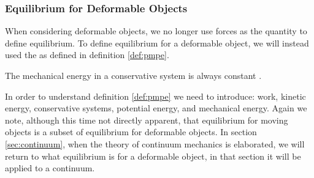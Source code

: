 



\subsubsection{Equilibrium for Deformable Objects}
\label{sec:equilibrium-for-deobj}
When considering deformable objects, we no longer use forces as
the quantity to define equilibrium.
%
%
To define equilibrium for a deformable object, we will instead used
the  as defined in
definition \vref{def:pmpe}.
 
\begin{definition}
\label{def:pmpe}
The mechanical energy in a conservative system is always constant
.
\end{definition}

In order to understand definition \vref{def:pmpe} we need to
introduce: work, kinetic energy, conservative systems, potential
energy, and mechanical energy. Again we note, although this time not
directly apparent, that equilibrium for moving objects is a subset of
equilibrium for deformable objects. In section \vref{sec:continuum},
when the theory of continuum mechanics is elaborated, we will return
to what equilibrium is for a deformable object, in that section it will be
applied to a continuum.

